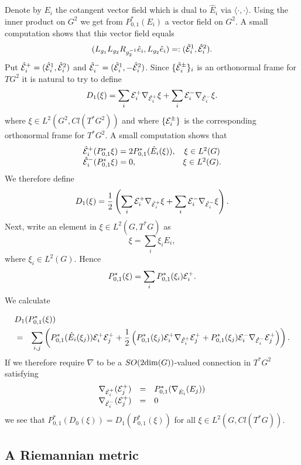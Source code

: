 \documentclass[12pt]{article}
\def\ce{{\cal E}}
\begin{document}
{Denote by $E_i$ the cotangent vector field which is dual to $\hat{E}_i$ via $\langle \cdot , \cdot \rangle$. Using the inner product on $G^2$ we get from $P_{0,1}^*(E_i)$ a vector field on $G^2$. A small computation shows that this vector field equals 
\begin{equation} \label{specialko}
(L_{g_1}L_{g_2}R_{g_2^{-1}}\hat{e}_i,L_{g_2}\hat{e}_i)=:(\hat{\ce}_i^1,\hat{\ce}_i^2).
\end{equation}
Put $\hat{\ce}_i^+=(\hat{\ce}_i^1,\hat{\ce}_i^2)$ and $\hat{\ce}_i^-=(\hat{\ce}_i^1,-\hat{\ce}_i^2 )$. Since $\{ \hat{\ce}_i^\pm \}_i$ is an orthonormal frame for $TG^2$ it is natural to try to define
$$D_1(\xi )=\sum_i \ce_i^+\nabla_{\hat{\ce}_i^+}\xi+\sum_i \ce_i^-\nabla_{\hat{\ce}_i^-}\xi.$$
where $\xi\in L^2(G^2,Cl(T^*G^2))$ and where $\{\ce^\pm_i\}$ is the corresponding orthonormal frame for $T^*G^2$.
A small computation shows that 
$$\begin{array}{lc}
\hat{\ce}_i^+(P^*_{0,1}\xi)=2 P_{0,1}^*(\hat{E}_i(\xi)), & \xi\in L^2(G)\\ 
\hat{\ce}_i^-(P^*_{0,1}\xi)=0, &\xi\in L^2(G).
 \end{array}$$
We therefore define 
$$D_1(\xi )=\frac{1}{2} \left(\sum_i \ce_i^+\nabla_{\hat{\ce}_i^+}\xi+\sum_i \ce_i^-\nabla_{\hat{\ce}_i^-}\xi \right) .$$
Next, write an element in $\xi \in L^2(G,T^*G)$ as 
$$\xi =\sum_i \xi_i E_i,$$
where $\xi_i \in L^2(G)$. Hence 
$$P^*_{0,1}(\xi )=\sum_i P_{0,1}^*(\xi_i)\ce_i^+.$$ 
We calculate

\begin{eqnarray*}
\lefteqn{D_1(P^*_{0,1}(\xi ))}\\
&=&\sum_{i,j}\left( P_{0,1}^*(\hat{E}_i(\xi_j))\ce_i^+ \ce^+_j+\frac{1}{2}\left( P_{0,1}^*(\xi_j)\ce_i^+\nabla_{\hat{\ce}_i^+}\ce_j^++P_{0,1}^*(\xi_j)\ce_i^-\nabla_{\hat{\ce}_i^-}\ce_j^+\right)  \right).
\end{eqnarray*}
If we therefore require $\nabla$ to be a $SO(2\hbox{dim}(G))$-valued connection in $T^*G^2$ satisfying
$$\begin{array}{ccl}
\nabla_{\hat{\ce}_i^+}(\ce_j^+)&=&P^*_{0,1}(\nabla_{\hat{E}_i}(E_j))\\
 \nabla_{\hat{\ce}_i^-}(\ce_j^+)&=&0
\end{array}$$
we see that $P^*_{0,1}(D_0(\xi))=D_1(P^*_{0,1}(\xi))$ for all $\xi \in L^2(G,Cl(T^*G))$.

\subsection{A Riemannian metric }\label{riem}

}
\end{document}

